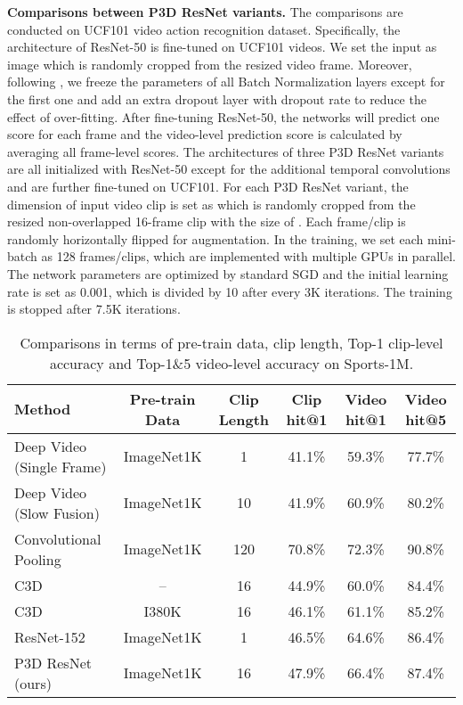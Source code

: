 \documentclass[10pt,twocolumn,letterpaper]{article}
\begin{document}
\textbf{Comparisons between P3D ResNet variants.} The comparisons are conducted on UCF101 \cite{UCF101} video action recognition dataset. Specifically, the architecture of ResNet-50 is fine-tuned on UCF101 videos. We set the input as  image which is randomly cropped from the resized  video frame. Moreover, following \cite{wang2016temporal}, we freeze the parameters of all Batch Normalization layers except for the first one and add an extra dropout layer with  dropout rate to reduce the effect of over-fitting. After fine-tuning ResNet-50, the networks will predict one score for each frame and the video-level prediction score is calculated by averaging all frame-level scores. The architectures of three P3D ResNet variants are all initialized with ResNet-50 except for the additional temporal convolutions and are further fine-tuned on UCF101. For each P3D ResNet variant, the dimension of input video clip is set as  which is randomly cropped from the resized non-overlapped 16-frame clip with the size of . Each frame/clip is randomly horizontally flipped for augmentation. In the training, we set each mini-batch as 128 frames/clips, which are implemented with multiple GPUs in parallel. The network parameters are optimized by standard SGD and the initial learning rate is set as 0.001, which is divided by 10 after every 3K iterations. The training is stopped after 7.5K iterations.

\begin{table*}
\centering
\small
\caption{\small Comparisons in terms of pre-train data, clip length, Top-1 clip-level accuracy and Top-1\&5 video-level accuracy on Sports-1M.}
\begin{tabular}{l|c|c|c|c|c} \hline
\textbf{Method}                                     & \textbf{Pre-train Data} &\textbf{Clip Length} & \textbf{Clip hit@1}    & \textbf{Video hit@1}  & \textbf{Video hit@5} \\ \hline
Deep Video (Single Frame) \cite{karpathy2014large}  & ImageNet1K     & 1           & 41.1\%        & 59.3\%       & 77.7\%      \\
Deep Video (Slow Fusion) \cite{karpathy2014large}   & ImageNet1K     & 10          & 41.9\%        & 60.9\%       & 80.2\%      \\
Convolutional Pooling \cite{yue2015beyond}          & ImageNet1K     & 120         & 70.8\%        & 72.3\%       & 90.8\%      \\
C3D \cite{tran2015learning}                         & --             & 16          & 44.9\%        & 60.0\%       & 84.4\%      \\
C3D \cite{tran2015learning}                         & I380K          & 16          & 46.1\%        & 61.1\%       & 85.2\%      \\ \hline
ResNet-152 \cite{he2015deep}             & ImageNet1K     & 1           & 46.5\%        & 64.6\%       & 86.4\%      \\
P3D ResNet (ours)             & ImageNet1K     & 16          & 47.9\%        & 66.4\%       & 87.4\%      \\ \hline
\end{tabular}
\label{tab:s1m}
\vspace{-0.18in}
\end{table*}
\end{document}
